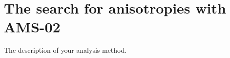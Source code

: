 \chapter{The search for anisotropies with AMS-02}
\label{ch:anisotropy}
The description of your analysis method.